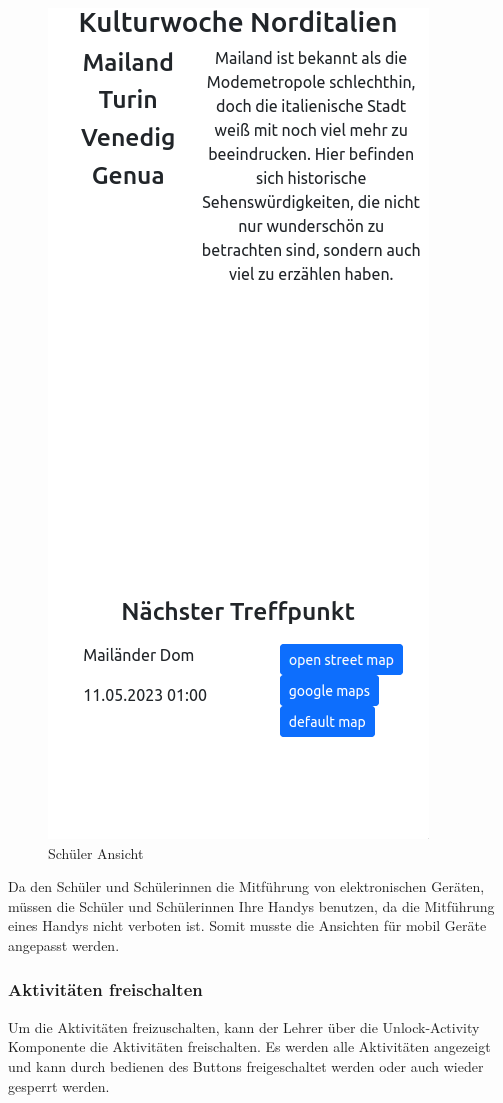 \begin{figure}[h]
    \centering
    \includegraphics[scale=0.8]{pics/overview.png}
    \caption{Schüler Ansicht}
    \label{lst:Overview}
\end{figure}

Da den Schüler und Schülerinnen die Mitführung von elektronischen Geräten, müssen die Schüler und Schülerinnen Ihre Handys benutzen, da die Mitführung eines Handys nicht verboten ist. Somit musste die Ansichten für mobil Geräte angepasst werden. 

\subsubsection{Aktivitäten freischalten}
Um die Aktivitäten freizuschalten, kann der Lehrer über die Unlock-Activity Komponente die Aktivitäten freischalten. Es werden alle Aktivitäten angezeigt und kann durch bedienen des Buttons freigeschaltet werden oder auch wieder gesperrt werden.

